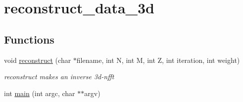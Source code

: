 \hypertarget{group__applications__mri3d__reconstruct__data__3d}{
\section{reconstruct\_\-data\_\-3d}
\label{group__applications__mri3d__reconstruct__data__3d}
}
\subsection*{Functions}
\begin{CompactItemize}
\item 
\hypertarget{group__applications__mri3d__reconstruct__data__3d_g2a7498187a28ecbd94373304d99bebc8}{
void \hyperlink{group__applications__mri3d__reconstruct__data__3d_g2a7498187a28ecbd94373304d99bebc8}{reconstruct} (char $\ast$filename, int N, int M, int Z, int iteration, int weight)}
\label{group__applications__mri3d__reconstruct__data__3d_g2a7498187a28ecbd94373304d99bebc8}

\begin{CompactList}\small\item\em reconstruct makes an inverse 3d-nfft \item\end{CompactList}\item 
\hypertarget{group__applications__mri3d__reconstruct__data__3d_g3c04138a5bfe5d72780bb7e82a18e627}{
int \hyperlink{group__applications__mri3d__reconstruct__data__3d_g3c04138a5bfe5d72780bb7e82a18e627}{main} (int argc, char $\ast$$\ast$argv)}
\label{group__applications__mri3d__reconstruct__data__3d_g3c04138a5bfe5d72780bb7e82a18e627}

\end{CompactItemize}
